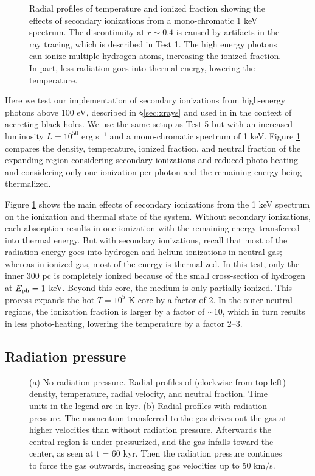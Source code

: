 \documentclass[apj,onecolumn]{emulateapj}
\begin{document}
\begin{figure}[t]
  \caption{\label{fig:xray_fig} Radial profiles of temperature and
    ionized fraction showing the effects of secondary ionizations from
    a mono-chromatic 1 keV spectrum.  The discontinuity at $r \sim
    0.4$ is caused by artifacts in the ray tracing, which is described
    in Test 1.  The high energy photons can ionize multiple hydrogen
    atoms, increasing the ionized fraction.  In part, less radiation
    goes into thermal energy, lowering the temperature.}
\end{figure}

Here we test our implementation of secondary ionizations from
high-energy photons above 100 eV, described in \S\ref{sec:xrays} and
used in \citet{Alvarez09} in the context of accreting black holes.  We
use the same setup as Test 5 but with an increased luminosity $L =
10^{50}$ erg s$^{-1}$ and a mono-chromatic spectrum of 1 keV.  Figure
\ref{fig:xray_fig} compares the density, temperature, ionized
fraction, and neutral fraction of the expanding  region
considering secondary ionizations and reduced photo-heating and
considering only one ionization per photon and the remaining energy
being thermalized.

Figure \ref{fig:xray_fig} shows the main effects of secondary
ionizations from the 1 keV spectrum on the ionization and thermal
state of the system.  Without secondary ionizations, each absorption
results in one ionization with the remaining energy transferred into
thermal energy.  But with secondary ionizations, recall that most of
the radiation energy goes into hydrogen and helium ionizations in
neutral gas; whereas in ionized gas, most of the energy is
thermalized.  In this test, only the inner 300 pc is completely
ionized because of the small cross-section of hydrogen at $E_{\rm ph}
= 1$ keV.  Beyond this core, the medium is only partially ionized.
This process expands the hot $T = 10^5$ K core by a factor of 2.  In
the outer neutral regions, the ionization fraction is larger by a
factor of $\sim 10$, which in turn results in less photo-heating,
lowering the temperature by a factor 2--3.

\subsection{Radiation pressure}

\begin{figure}[t]
  \caption{\label{fig:rp_profiles} (a) No radiation pressure.
    Radial profiles of (clockwise from top left) density, temperature,
    radial velocity, and neutral fraction.  Time units in the legend
    are in kyr.  (b) Radial profiles with radiation pressure.  The
    momentum transferred to the gas drives out the gas at higher
    velocities than without radiation pressure.  Afterwards the
    central region is under-pressurized, and the gas infalls toward the
    center, as seen at t = 60 kyr.  Then the radiation pressure
    continues to force the gas outwards, increasing gas velocities up
    to 50 km/s.}
\end{figure}
\end{document}
